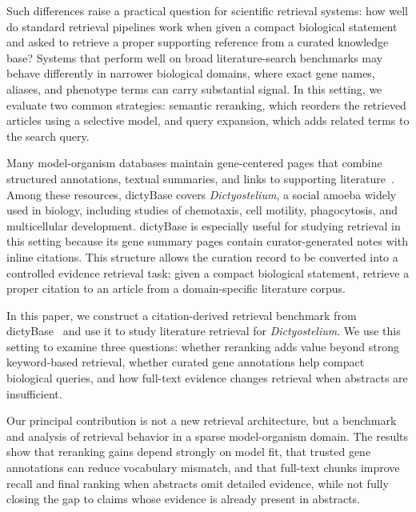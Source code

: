 \documentclass[runningheads]{llncs}
\begin{document}
Such differences raise a practical question for scientific retrieval systems: how well do standard retrieval pipelines work when given a compact biological statement and asked to retrieve a proper supporting reference from a curated knowledge base? Systems that perform well on broad literature-search
benchmarks may behave differently in narrower biological domains, where exact
gene names, aliases, and phenotype terms can carry substantial signal. In this
setting, we evaluate two common strategies: semantic reranking, which reorders the retrieved articles using a selective model, and query expansion, which adds related terms to the search query.

Many model-organism databases maintain gene-centered pages that combine
structured annotations, textual summaries, and links to supporting literature~\cite{ozturk-colak_flybase_2024,harris_wormbase_2020}. Among these resources, dictyBase covers \emph{Dictyostelium}, a social amoeba
widely used in biology, including studies of chemotaxis,
cell motility, phagocytosis, and multicellular development.
dictyBase is especially useful for studying retrieval in this setting because its
gene summary pages contain curator-generated notes with inline citations. This
structure allows the curation record to be converted into a controlled evidence
retrieval task: given a compact biological statement, retrieve a proper citation to an
article from a domain-specific literature corpus.

In this paper, we construct a citation-derived retrieval benchmark from
dictyBase~\cite{fey_one_2013} and use it to study literature retrieval for
\emph{Dictyostelium}. We use this setting to examine three questions: whether reranking adds value beyond strong keyword-based retrieval, whether curated gene annotations
help compact biological queries, and how full-text evidence changes retrieval
when abstracts are insufficient.

Our principal contribution is not a new retrieval architecture, but a benchmark
and analysis of retrieval behavior in a sparse model-organism domain. The
results show that reranking gains depend strongly on model fit, that trusted
gene annotations can reduce vocabulary mismatch, and that full-text chunks improve
recall and final ranking when abstracts omit detailed evidence, while not fully
closing the gap to claims whose evidence is already present in abstracts.
\end{document}
